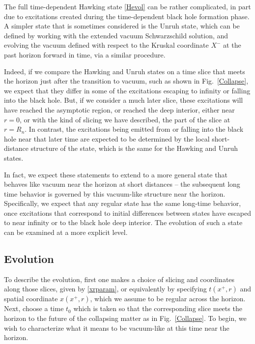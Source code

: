 \documentclass[12pt]{article}
\numberwithin{equation}{section}
\begin{document}
The full time-dependent Hawking state \eqref{Hevol} can be rather complicated, in  part due to excitations created during the time-dependent black hole formation phase.  A simpler state that is sometimes considered is the Unruh state\cite{Unru}, which can be defined by working with the extended vacuum Schwarzschild solution, and evolving the vacuum defined with respect to the Kruskal coordinate $X^-$ at the past horizon forward in time, via a similar procedure.

Indeed, if we compare the Hawking and Unruh states on a time slice that meets the horizon just after the transition to vacuum, such as shown in Fig.~\ref{Collapse}, we expect that they differ in some of the excitations escaping to infinity or falling into the black hole.  But, if we consider a much later slice, these excitations will have reached the asymptotic region, or reached the deep interior, either near $r=0$, or with the kind of slicing we have described, the part of the slice at $r=R_n$.
In contrast, the excitations being emitted from or falling into the black hole near that later time are expected to be determined by the local short-distance structure of the state, which is the same for the Hawking and Unruh states.

In fact, we expect these statements to extend to a more general state that behaves like vacuum near the horizon at short distances -- the subsequent long time behavior is governed by this vacuum-like structure near the horizon.  Specifically, we expect that any regular state has the same long-time behavior, once excitations that correspond to initial differences between states have escaped to near infinity or to  the black hole deep interior.  The evolution of such a state can be examined at a more explicit level.  

\subsection{Evolution}

 To describe the evolution, first one makes a choice of slicing and coordinates along those slices, given by \eqref{xrparam}, or equivalently by specifying $t(x^+,r)$ and spatial coordinate $x(x^+,r)$, which we assume to be regular across the horizon.  Next, choose a time $t_0$ which is taken so that the corresponding slice meets the horizon to the future of the collapsing matter as in Fig.~\ref{Collapse}.  To begin, we wish to characterize what it means to be vacuum-like at this time near the horizon.
 
\end{document}
